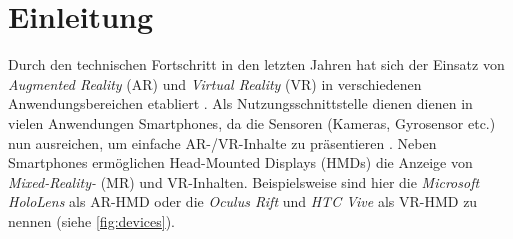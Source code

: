 \chapter{Einleitung}
\label{chap:einleitung}

Durch den technischen Fortschritt in den letzten Jahren hat sich der Einsatz von \emph{Augmented Reality} (AR) und \emph{Virtual Reality} (VR) in verschiedenen Anwendungsbereichen etabliert \parencite{Krevelen2010, Zhao2009, Sharples2008, Jung2008}.
Als Nutzungsschnittstelle dienen dienen in vielen Anwendungen Smartphones, da die Sensoren (Kameras, Gyrosensor etc.) nun ausreichen, um einfache AR-/VR-Inhalte zu präsentieren \parencite{Li2017b,Feng2017,Yoo2015,Mulloni2012}.
Neben Smartphones ermöglichen Head-Mounted Displays (HMDs) die Anzeige von \emph{Mixed-Reality-} (MR) und VR-Inhalten.
Beispielsweise sind hier die \emph{Microsoft HoloLens} \parencite{Microsoft2018} als AR-HMD oder die \emph{Oculus Rift} \parencite{Facebook2018} und \emph{HTC Vive} \parencite{HTCCorporation2018} als VR-HMD zu nennen (siehe \autoref{fig:devices}).
